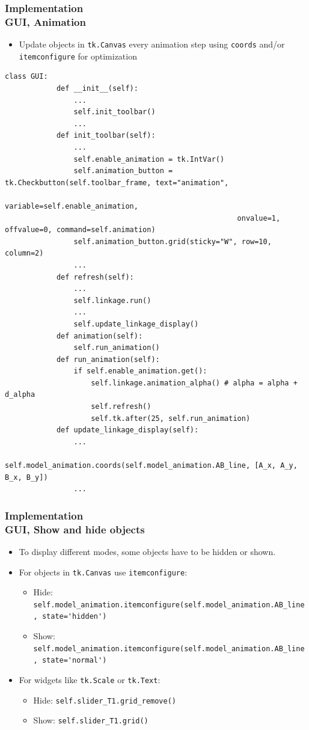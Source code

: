 \documentclass[ucs,10pt]{beamer}
\begin{document}
\begin{frame}[fragile]
\frametitle{Implementation \\
	\small \color{rwth-blue} GUI, Animation}
	\vspace*{-0.7mm}
	\begin{itemize}
		\item Update objects in \lstinline|tk.Canvas| every animation step using \lstinline|coords| and/or \lstinline|itemconfigure| for optimization
	\end{itemize}
	\vspace*{-1.8mm}
	\begin{lstlisting}[basicstyle=\ssmall]
		class GUI:
			def __init__(self):
				...
				self.init_toolbar()
				...
			def init_toolbar(self):
				...
				self.enable_animation = tk.IntVar()
				self.animation_button = tk.Checkbutton(self.toolbar_frame, text="animation", 
				                                      variable=self.enable_animation,
				                                      onvalue=1, offvalue=0, command=self.animation)
				self.animation_button.grid(sticky="W", row=10, column=2)
				...
			def refresh(self):
				...
				self.linkage.run()
				...
				self.update_linkage_display()
			def animation(self):
				self.run_animation()
			def run_animation(self):
				if self.enable_animation.get():
					self.linkage.animation_alpha() # alpha = alpha + d_alpha
					self.refresh()
					self.tk.after(25, self.run_animation)
			def update_linkage_display(self):
				...
				self.model_animation.coords(self.model_animation.AB_line, [A_x, A_y, B_x, B_y])
				...			
	\end{lstlisting}
\end{frame}

\begin{frame}[fragile]
\frametitle{Implementation \\
	\small \color{rwth-blue} GUI, Show and hide objects}
	\begin{itemize}
		\item To display different modes, some objects have to be hidden or shown.
		\item For objects in \lstinline|tk.Canvas| use \lstinline|itemconfigure|:
		\begin{itemize}
			\item Hide: \lstinline|self.model_animation.itemconfigure(self.model_animation.AB_line, state='hidden')|
			\item Show: \lstinline|self.model_animation.itemconfigure(self.model_animation.AB_line, state='normal')|
		\end{itemize}
		\item For widgets like \lstinline|tk.Scale| or \lstinline|tk.Text|:
		\begin{itemize}
			\item Hide: \lstinline|self.slider_T1.grid_remove()|
			\item Show: \lstinline|self.slider_T1.grid()|
		\end{itemize}
	\end{itemize}
\end{frame}
\end{document}
